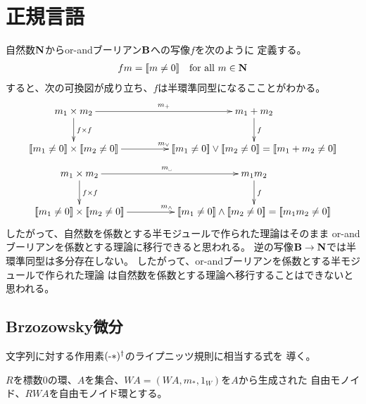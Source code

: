 \section{正規言語}\label{s1:正規言語} %
	\begin{note}[半モジュールの係数]\label{note:半モジュールの係数} %
		自然数${\mathbf{N}}$からor-andブーリアン${\mathbf{B}}$への写像$f$を次のように
		定義する。
		\begin{equation*}\begin{split} %
			fm = \jump{m\neq0} \quad\text{for all }m\in\mybf{N}
		\end{split}\end{equation*} %
		すると、次の可換図が成り立ち、$f$は半環準同型になるこことがわかる。
		\begin{equation*}\xymatrix@C+2pc{
			m_1\times m_2 \ar[r]^{m_+} \ar[d]^{f\times f} 
			& m_1+m_2 \ar[d]^{f} \\
			\jump{m_1\neq0}\times \jump{m_2\neq0} \ar[r]^{m_\lor}
			& \jump{m_1\neq0}\lor\jump{m_2\neq0}=\jump{m_1+m_2\neq0}
		}\end{equation*}
		\begin{equation*}\xymatrix@C+2pc{
			m_1\times m_2 \ar[r]^{m_\myspace} \ar[d]^{f\times f} 
			& m_1m_2 \ar[d]^{f} \\
			\jump{m_1\neq0}\times \jump{m_2\neq0} \ar[r]^{m_\land}
			& \jump{m_1\neq0}\land\jump{m_2\neq0}=\jump{m_1m_2\neq0}
		}\end{equation*}
		したがって、自然数を係数とする半モジュールで作られた理論はそのまま
		or-andブーリアンを係数とする理論に移行できると思われる。
		逆の写像${\mathbf{B}}\to{\mathbf{N}}$では半環準同型は多分存在しない。
		したがって、or-andブーリアンを係数とする半モジュールで作られた理論
		は自然数を係数とする理論へ移行することはできないと思われる。
	\end{note} %

	\subsection{Brzozowsky微分}\label{s2:Brzozowsky微分} %
		文字列に対する作用素$(\myhere*)^\dag$のライプニッツ規則に相当する式を
		導く。

		$R$を標数$0$の環、$A$を集合、$WA=(WA,m_*,1_W)$を$A$から生成された
		自由モノイド、$RWA$を自由モノイド環とする。

